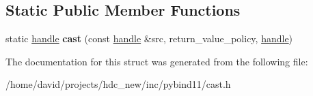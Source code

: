 \subsection*{Static Public Member Functions}
\begin{DoxyCompactItemize}
\item 
static \hyperlink{classhandle}{handle} {\bfseries cast} (const \hyperlink{classhandle}{handle} \&src, return\+\_\+value\+\_\+policy, \hyperlink{classhandle}{handle})\hypertarget{structtype__caster_3_01type_00_01typename_01std_1_1enable__if_3_01std_1_1is__base__of_3_01handle895eb023ef379cba07cd00cafde71ea3_a71d17aa7806abc7774cb7fdd0b491e27}{}\label{structtype__caster_3_01type_00_01typename_01std_1_1enable__if_3_01std_1_1is__base__of_3_01handle895eb023ef379cba07cd00cafde71ea3_a71d17aa7806abc7774cb7fdd0b491e27}

\end{DoxyCompactItemize}


The documentation for this struct was generated from the following file\+:\begin{DoxyCompactItemize}
\item 
/home/david/projects/hdc\+\_\+new/inc/pybind11/cast.\+h\end{DoxyCompactItemize}
